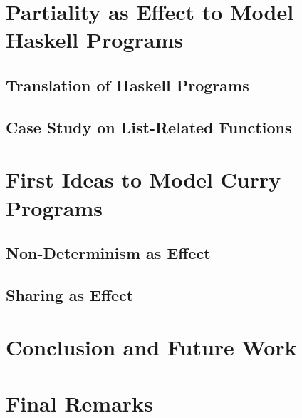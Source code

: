 \section{Partiality as Effect to Model Haskell Programs}
\subsection{Translation of Haskell Programs}
\subsection{Case Study on List-Related Functions}

\section{First Ideas to Model Curry Programs}
\subsection{Non-Determinism as Effect}
\subsection{Sharing as Effect}

\section{Conclusion and Future Work}

\section{Final Remarks}

